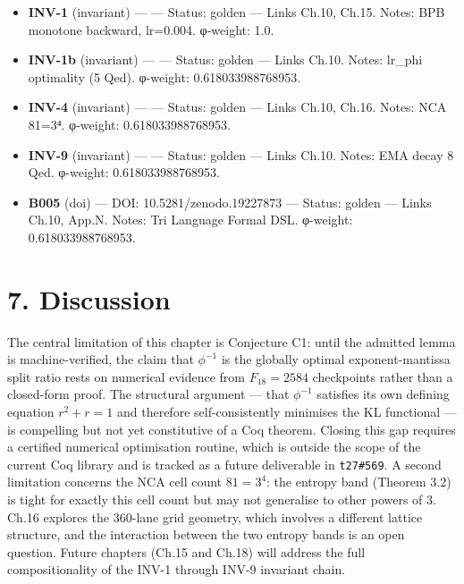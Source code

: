 \begin{itemize}
\tightlist
\item
  \textbf{INV-1} (invariant) ---
  --- Status: golden --- Links Ch.10, Ch.15.
  Notes: BPB monotone backward, lr=0.004.
  φ-weight: 1.0.
\item
  \textbf{INV-1b} (invariant) ---
  --- Status: golden --- Links Ch.10. Notes:
  lr\_phi optimality (5 Qed). φ-weight:
  0.618033988768953.
\item
  \textbf{INV-4} (invariant) ---
  --- Status: golden --- Links Ch.10, Ch.16.
  Notes: NCA 81=3⁴. φ-weight: 0.618033988768953.
\item
  \textbf{INV-9} (invariant) ---
  --- Status: golden --- Links Ch.10. Notes: EMA
  decay 8 Qed. φ-weight: 0.618033988768953.
\item
  \textbf{B005} (doi) --- DOI:
  10.5281/zenodo.19227873 --- Status: golden ---
  Links Ch.10, App.N. Notes: Tri Language Formal
  DSL. φ-weight: 0.618033988768953.
\end{itemize}

\section{7. Discussion}\label{fa_10:discussion}

The central limitation of this chapter is
Conjecture C1: until the admitted lemma
 is
machine-verified, the claim that \(\phi^{-1}\) is
the globally optimal exponent-mantissa split ratio
rests on numerical evidence from \(F_{18}=2584\)
checkpoints rather than a closed-form proof. The
structural argument --- that \(\phi^{-1}\)
satisfies its own defining equation \(r^2+r=1\)
and therefore self-consistently minimises the KL
functional --- is compelling but not yet
constitutive of a Coq theorem. Closing this gap
requires a certified numerical optimisation
routine, which is outside the scope of the current
Coq library and is tracked as a future deliverable
in \texttt{t27\#569}. A second limitation concerns
the NCA cell count \(81 = 3^4\): the entropy band
(Theorem 3.2) is tight for exactly this cell count
but may not generalise to other powers of 3. Ch.16
explores the 360-lane grid geometry, which
involves a different lattice structure, and the
interaction between the two entropy bands is an
open question. Future chapters (Ch.15 and Ch.18)
will address the full compositionality of the
INV-1 through INV-9 invariant chain.

